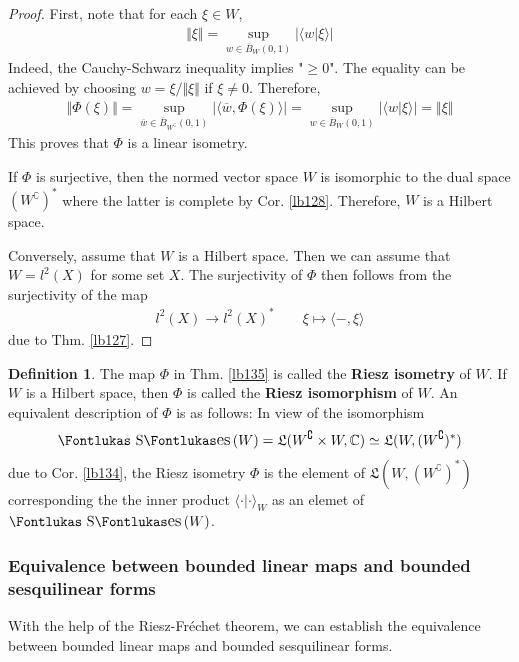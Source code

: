 \documentclass[12pt,b5paper,notitlepage]{article}
\theoremstyle{definition}
\newtheorem{df}{Definition}[subsection]
\theoremstyle{plain}
\DeclareMathOperator{\Ses}{\text{\Fontlukas S}\text{\kern -0pt {\Fontlukas\large es}}\,}
\newcommand{\fk}{\mathfrak}
\newcommand{\ovl}{\overline}
\newcommand{\bk}[1]{\langle {#1}\rangle}
\newcommand{\Co}{\complement}
\newcommand{\Cbb}{\mathbb C}
\numberwithin{equation}{section}
\begin{document}
\begin{proof}
First, note that for each $\xi\in W$,
\begin{align}
\Vert\xi\Vert=\sup_{w\in\ovl B_W(0,1)}|\bk{w|\xi}|
\end{align}
Indeed, the Cauchy-Schwarz inequality implies "$\geq0$". The equality can be achieved by choosing $w=\xi/\Vert\xi\Vert$ if $\xi\neq0$. Therefore,
\begin{align*}
\Vert\Phi(\xi)\Vert=\sup_{\ovl w\in\ovl B_{W^\Co}(0,1)}|\bk{\ovl w,\Phi(\xi)}|=\sup_{w\in\ovl B_W(0,1)}|\bk{w|\xi}|=\Vert\xi\Vert
\end{align*}
This proves that $\Phi$ is a linear isometry.

If $\Phi$ is surjective, then the normed vector space $W$ is isomorphic to the dual space $(W^\Co)^*$ where the latter is complete by Cor. \ref{lb128}. Therefore, $W$ is a Hilbert space.

Conversely, assume that $W$ is a Hilbert space. Then we can assume that $W=l^2(X)$ for some set $X$. The surjectivity of $\Phi$ then follows from the surjectivity of the map
\begin{align*}
l^2(X)\rightarrow l^2(X)^*\qquad \xi\mapsto \bk{-,\xi}
\end{align*}
due to Thm. \ref{lb127}.
\end{proof}


\begin{df}
The map $\Phi$ in Thm. \ref{lb135} is called the \textbf{Riesz isometry} of $W$. If $W$ is a Hilbert space, then $\Phi$ is called the \textbf{Riesz isomorphism} of $W$.  An equivalent description of $\Phi$ is as follows: In view of the isomorphism
\begin{align*}
\Ses(W)=\fk L(W^\Co\times W,\Cbb)\simeq\fk L(W,(W^\Co)^*)
\end{align*}
due to Cor. \ref{lb134}, the Riesz isometry $\Phi$ is the element of $\fk L(W,(W^\Co)^*)$ corresponding the the inner product $\bk{\cdot|\cdot}_W$ as an elemet of $\Ses(W)$.
\end{df}


\subsubsection{Equivalence between bounded linear maps and bounded sesquilinear forms}






With the help of the Riesz-Fr\'echet theorem, we can establish the equivalence between bounded linear maps and bounded sesquilinear forms.
\end{document}
